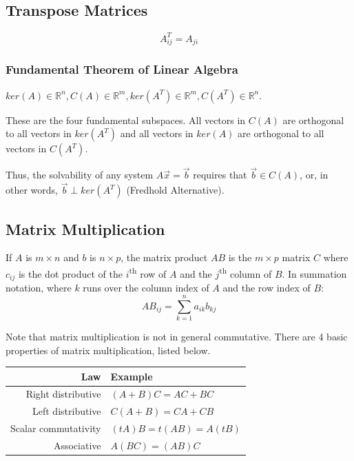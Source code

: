 \documentclass[11pt]{article}
\begin{document}
	\subsection{Transpose Matrices}
		\begin{equation}
			A^T_{ij} = A_{ji}
		\end{equation}
		
		\subsubsection{Fundamental Theorem of Linear Algebra}
			$ker(A)\in\mathbb{R}^n, C(A)\in\mathbb{R}^m, ker(A^T)\in\mathbb{R}^m,C(A^T)\in\mathbb{R}^n$.
			
			These are the four fundamental subspaces. All vectors in $C(A)$ are orthogonal to all vectors in $ker(A^T)$ and all vectors in $ker(A)$ are orthogonal to all vectors in $C(A^T)$.
			
			Thus, the solvability of any system $A\vec{x} = \vec{b}$ requires that $\vec{b}\in C(A)$, or, in other words, $\vec{b}\perp ker(A^T)$ (Fredhold Alternative).
	
	\subsection{Matrix Multiplication}
		If $A$ is $m\times n$ and $b$ is $n\times p$, the matrix product $AB$ is the $m\times p$ matrix $C$ where $c_{ij}$ is the dot product of the $i$\textsuperscript{th} row of $A$ and the $j$\textsuperscript{th} column of $B$. In summation notation, where $k$ runs over the column index of $A$ and the row index of $B$:
		\begin{equation}
			AB_{ij} = \sum_{k=1}^n a_{ik}b_{kj}
		\end{equation}
		
		Note that matrix multiplication is not in general commutative. There are 4 basic properties of matrix multiplication, listed below.
		\begin{center}
			\begin{tabular}{r|l}
				Law							& Example\\\hline
				Right distributive			& $(A+B)C = AC+BC$\\
				Left distributive			& $C(A+B) = CA+CB$\\
				Scalar commutativity		& $(tA)B=t(AB)=A(tB)$\\
				Associative					& $A(BC)=(AB)C$
			\end{tabular}
		\end{center}
		
\end{document}

